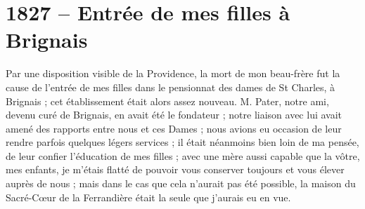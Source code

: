 \documentclass[11pt,a4paper]{report}
\begin{document}
\section*{1827 -- Entrée de mes filles à Brignais}

Par une disposition visible de la Providence, la mort de mon beau-frère fut la cause de l'entrée de mes filles dans le pensionnat des dames de St Charles, à Brignais ; cet établissement était alors assez nouveau. M. Pater, notre ami, devenu curé de Brignais, en avait été le fondateur ; notre liaison avec lui avait amené des rapports entre nous et ces Dames ; nous avions eu occasion de leur rendre parfois quelques légers services ; il était néanmoins bien loin de ma pensée, de leur confier l'éducation de mes filles ; avec une mère aussi capable que la vôtre, mes enfants, je m'étais flatté de pouvoir vous conserver toujours et vous élever auprès de nous ; mais dans le cas que cela n'aurait pas été possible, la maison du Sacré-Cœur de la Ferrandière était la seule que j'aurais eu en vue.
\end{document}
